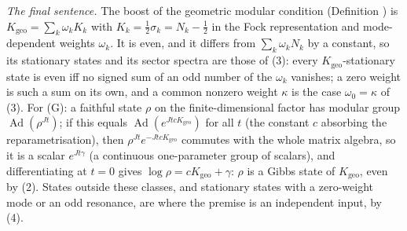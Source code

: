 \emph{The final sentence.} The boost of the geometric modular condition (Definition ) is $K_{\mathrm{geo}} = \sum_k \omega_k K_k$ with $K_k = \tfrac12\sigma_k = N_k - \tfrac12$ in the Fock representation and mode-dependent weights $\omega_k$. It is even, and it differs from $\sum_k\omega_kN_k$ by a constant, so its stationary states and its sector spectra are those of (3): every $K_{\mathrm{geo}}$-stationary state is even iff no signed sum of an odd number of the $\omega_k$ vanishes; a zero weight is such a sum on its own, and a common nonzero weight $\kappa$ is the case $\omega_0 = \kappa$ of (3). For (G): a faithful state $\rho$ on the finite-dimensional factor has modular group $\operatorname{Ad}(\rho^{Jt})$; if this equals $\operatorname{Ad}(e^{JtcK_{\mathrm{geo}}})$ for all $t$ (the constant $c$ absorbing the reparametrisation), then $\rho^{Jt}e^{-JtcK_{\mathrm{geo}}}$ commutes with the whole matrix algebra, so it is a scalar $e^{J t \gamma}$ (a continuous one-parameter group of scalars), and differentiating at $t = 0$ gives $\log\rho = cK_{\mathrm{geo}} + \gamma$: $\rho$ is a Gibbs state of $K_{\mathrm{geo}}$, even by (2). States outside these classes, and stationary states with a zero-weight mode or an odd resonance, are where the premise is an independent input, by (4).
